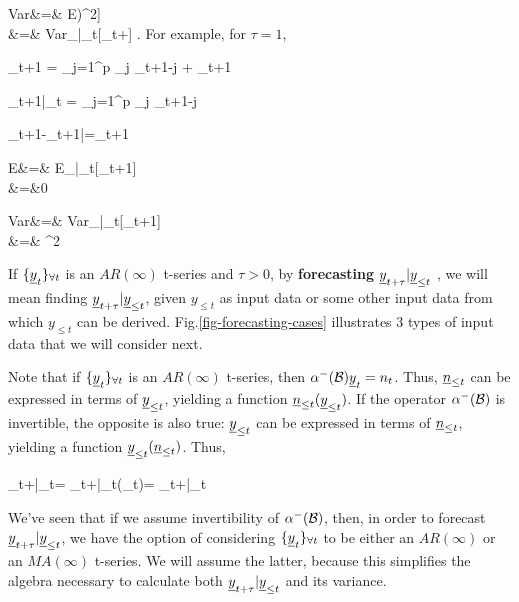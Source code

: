 \beqa
Var&=&
E\left[
\left(\rvy_{t+\tau}|\rvy_{\leq t}
-E[\rvy_{t+\tau}|\rvy_{\leq t}]
\right)^2\right]
\\
&=&
Var_{|\rvy_{\leq t}}[\rvy_{t+\tau}]
\;.
\eeqa
For example, for $\tau=1$,


\beq
\rvy_{t+1} = \sum_{j=1}^p \alp_j \rvy_{t+1-j}
+ \rvn_{t+1}
\eeq

\beq
\rvy_{t+1}|\rvy_{\leq t} =
\sum_{j=1}^p \alp_j \rvy_{t+1-j}
\eeq

\beq
\rvy_{t+1}-\rvy_{t+1|}=\rvn_{t+1}
\eeq

\beqa
E&=&
E_{|\rvy_{\leq t}}[\rvy_{t+1}]
\\
&=&0
\eeqa

\beqa
Var
&=&
Var_{|\rvy_{\leq t}}[\rvy_{t+1}]
\\
&=& \s^2
\eeqa

If $\tseries{\rvy_t}$
is an $AR(\infty)$
t-series and $\tau>0$,
by {\bf forecasting} $\rvy_{t+\tau}|\rvy_{\leq t}$ ,
we will mean
finding $\rvy_{t+\tau}|\rvy_{\leq t}$,
given
$y_{\leq t}$
as input data
or some other input data
from which $y_{\leq t}$
can be derived.
Fig.\ref{fig-forecasting-cases}
illustrates 3 types
of input
data that we will consider
next.



Note that if $\tseries{\rvy_t}$
is an $AR(\infty)$
t-series,
then $\alp^-(\calb)\rvy_t=n_t$.
Thus, $\rvn_{\leq t}$
can be expressed in terms
of $\rvy_{\leq t}$,
yielding a function
$\rvn_{\leq t}(\rvy_{\leq t})$.
If the operator
$\alpha^-({\cal B})$
is invertible,
the opposite is also true: $\rvy_{\leq t}$
can be expressed in terms
of $\rvn_{\leq t}$,
yielding a function
$\rvy_{\leq t}(\rvn_{\leq t})$.
Thus,

\beq
\rvy_{t+\tau}|\rvy_{\leq t}=
\rvy_{t+\tau}|\rvy_{\leq t}(\rvn_{\leq t})=
\rvy_{t+\tau}|\rvn_{\leq t}
\eeq

We've
seen that
 if we
assume invertibility
of $\alpha^-({\cal B})$, then,
in order
to forecast $\rvy_{t+\tau}|\rvy_{\leq t}$,
we have the option
of considering $\tseries{\rvy_t}$ to be
either an $AR(\infty)$
or an $MA(\infty)$
t-series. We will assume
the latter,
because this
simplifies
the algebra
necessary to calculate
both
$\rvy_{t+\tau}|\rvy_{\leq t}$
and its
variance.


\newcommand{\yLt}[0]
{given $\rvy_{\leq t}$}


\newcommand{\ynAPPROX}[0]
{given $\rvy_{\leq t}$, but,
 for some $m>0$,
$\rvy_{\leq t-m}\approx 0$ (approximation)}

